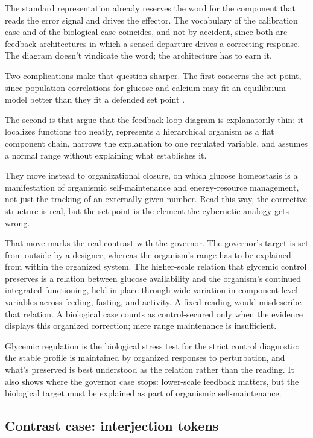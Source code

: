 \documentclass[12pt]{article}
\begin{document}
The standard representation already reserves the word  for the
component that reads the error signal and drives the effector. The vocabulary of
the calibration case and of the biological case coincides, and not by accident,
since both are feedback architectures in which a sensed departure drives a
correcting response. The diagram doesn't vindicate the word; the architecture
has to earn it.

Two complications make that question sharper. The first concerns the set point,
since population correlations for glucose and calcium may fit an equilibrium model
better than they fit a defended set point \citep{fitzgeraldBean2018}.

The second is that \textcite{bichMossioSoto2020} argue that the feedback-loop
diagram is explanatorily thin: it localizes functions too neatly, represents a
hierarchical organism as a flat component chain, narrows the explanation to one
regulated variable, and assumes a normal range without explaining what
establishes it.

They move instead to organizational closure, on which glucose homeostasis is a
manifestation of organismic self-maintenance and energy-resource management, not
just the tracking of an externally given number. Read this way, the corrective
structure is real, but the set point is the element the cybernetic analogy gets
wrong.

That move marks the real contrast with the governor. The governor's target is set
from outside by a designer, whereas the organism's range has to be explained from
within the organized system. The higher-scale relation that glycemic control
preserves is a relation between glucose availability and the organism's continued
integrated functioning, held in place through wide variation in component-level
variables across feeding, fasting, and activity. A fixed reading would misdescribe
that relation. A biological case counts as control-secured only when the evidence
displays this organized correction; mere range maintenance is insufficient.

Glycemic regulation is the biological stress test for the strict control
diagnostic: the stable profile is maintained by organized responses to
perturbation, and what's preserved is best understood as the relation rather than
the reading. It also shows where the governor case stops: lower-scale feedback
matters, but the biological target must be explained as part of organismic
self-maintenance.

\subsection{Contrast case: interjection tokens}
\end{document}
